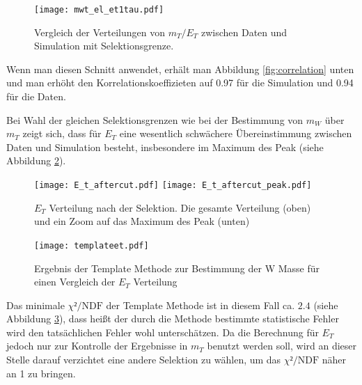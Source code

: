 \documentclass[a4paper,12pt]{article}
\newcommand{\met}{\ensuremath{\not\mathrel{E}}_T}
\begin{document}
\begin{figure}[htb]
	\centering
	\texttt{[image: mwt\_el\_et1tau.pdf]}
	\caption{Vergleich der Verteilungen von $m_T/E_T$ zwischen Daten und Simulation mit
	Selektionsgrenze.}
	\label{fig:verhaeltnis}
\end{figure}

Wenn man diesen Schnitt anwendet, erhält man Abbildung \ref{fig:correlation} unten und man
erhöht den Korrelationskoeffizieten auf 0.97 für die Simulation und 0.94 für die Daten.

Bei Wahl der gleichen Selektionsgrenzen wie bei der Bestimmung von $m_{W}$ über $m_T$ zeigt sich, dass 
für $E_{T}$ eine wesentlich schwächere Übereinstimmung zwischen Daten und Simulation besteht, insbesondere
im Maximum des Peak (siehe Abbildung \ref{fig:etaftercut}).
\begin{figure}[htb]
	\centering
	\texttt{[image: E\_t\_aftercut.pdf]}
	\texttt{[image: E\_t\_aftercut\_peak.pdf]}
	\caption{$E_{T}$ Verteilung nach der Selektion. Die gesamte Verteilung (oben) und ein Zoom auf das Maximum des Peak (unten) }
	\label{fig:etaftercut}
\end{figure}






\begin{figure}[htb]
	\centering
	\texttt{[image: templateet.pdf]}
	\caption{Ergebnis der Template Methode zur Bestimmung der W Masse für einen Vergleich der $E_{T}$ Verteilung}
	\label{fig:chiet}
\end{figure}
Das minimale $χ²/\text{NDF}$ der Template Methode ist in diesem Fall ca. $2.4$ (siehe Abbildung
\ref{fig:chiet}), dass heißt der durch die Methode bestimmte statistische Fehler wird
den tatsächlichen Fehler wohl unterschätzen. Da die Berechnung für $E_{T}$ jedoch nur zur Kontrolle der Ergebnisse in $m_{T}$ benutzt werden soll,
wird an dieser Stelle darauf verzichtet eine andere Selektion zu wählen, um das $χ²/\text{NDF}$ näher an 1 zu bringen.
\end{document}
